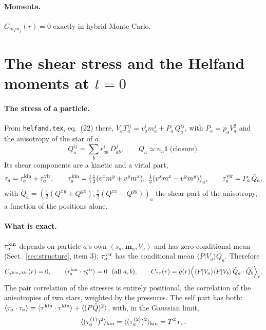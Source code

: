 \documentclass[11pt,aps,preprint,nofootinbib,superscriptaddress,tightenlines]{revtex4-2}
\newcommand{\one}{\mathds{1}}
\newcommand{\avg}[1]{\langle #1\rangle}
\def\st{\begin{equation}}
\def\stp{\end{equation}}
\def\Sect#1{Sect.~\ref{#1}}
\let\oldparagraph\paragraph
\renewcommand{\paragraph}{\par\bigskip\oldparagraph}
\begin{document}
\paragraph{Momenta.}  $C_{m_im_j}(r)=0$ exactly in hybrid Monte Carlo.

\section{The shear stress and the Helfand moments at $t=0$}
\label{sec:stress}

\paragraph{The stress of a particle.}  From \texttt{helfand.tex}, eq.~(22) there, $V_aT_a^{ij}=v_a^im_a^j+P_a\,Q_a^{ij}$, with $P_a=p_aV_a^2$ and the
anisotropy of the star of $a$
\st
Q_a^{ij}=\sum_br_{ab}^i\,D_{ab}^j,\qquad Q_a\simeq n_a\one\ \text{(closure)} .
\stp
Its shear components are a kinetic and a virial part,
\st
\tau_a=\tau_a^{\rm kin}+\tau_a^{\rm vir},\qquad
\tau_a^{\rm kin}=\big(\tfrac12(v^xm^y+v^ym^x),\ \tfrac12(v^xm^x-v^ym^y)\big)_a,\qquad
\tau_a^{\rm vir}=P_a\,\mathring Q_a,
\stp
with $\mathring Q_a=(\tfrac12(Q^{xy}+Q^{yx}),\tfrac12(Q^{xx}-Q^{yy}))_a$ the shear part of the anisotropy, a function of the positions alone.

\paragraph{What is exact.}  $\tau^{\rm kin}_a$ depends on particle $a$'s own $(s_a,\bm m_a,V_a)$ and has zero conditional mean (\Sect{sec:structure}, item 3); $\tau^{\rm vir}_a$
has the conditional mean $\avg{P|V_a}\mathring Q_a$.  Therefore
\st
C_{\tau^{\rm kin}\tau^{\rm kin}}(r)=0,\qquad \avg{\tau_a^{\rm kin}\cdot\tau_b^{\rm vir}}=0\ \ (\text{all }a,b),\qquad
C_{\tau\tau}(r)=g(r)\Big\langle\avg{P|V_a}\avg{P|V_b}\,\mathring Q_a\cdot\mathring Q_b\Big\rangle_r .
\label{stressexact}
\stp
The pair correlation of the stresses is entirely positional, the correlation of the anisotropies of two stars, weighted by the pressures.
The self part has both: $\avg{\tau_a\cdot\tau_a}=\avg{\tau^{\rm kin}\cdot\tau^{\rm kin}}+\avg{(P\mathring Q)^2}$, with, in the Gaussian limit,
\st
\avg{(\tau_a^{(1)})^2}_{\rm kin}=\avg{(\tau_a^{(2)})^2}_{\rm kin}=T^2\,r_\tau .
\stp
\end{document}
